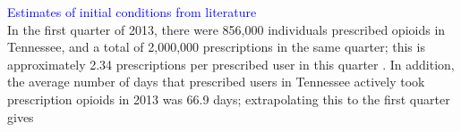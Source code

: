 \documentclass[12pt]{article}
\begin{document}
\textcolor{blue}{Estimates of initial conditions from literature} \\

In the first quarter of 2013, there were 856,000 individuals prescribed opioids in Tennessee, and a total of 2,000,000 prescriptions in the same quarter; this is approximately 2.34 prescriptions per prescribed user in this quarter \cite{PDO}. In addition, the average number of days that prescribed users in Tennessee actively took prescription opioids in 2013 was 66.9 days; extrapolating this to the first quarter gives 
\end{document}
